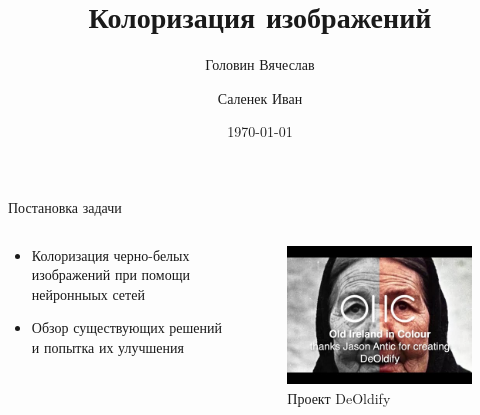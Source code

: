 \documentclass[aspectratio=169]{beamer}
\title[Заголовок]{Колоризация изображений}
\author{Головин Вячеслав \and Саленек Иван}
\date{\today}
\begin{document}
\renewcommand{\inserttotalframenumber}{8}   %

\frame[plain]{\titlepage}	%

\begin{frame}{Постановка задачи}
\begin{columns}
    \begin{column}{.6\textwidth}
    \begin{itemize}
        \item Колоризация черно-белых изображений при помощи нейронныых сетей
        
        \item Обзор существующих решений и попытка их улучшения
    \end{itemize}
    \end{column}
    \begin{column}{.4\textwidth}
    \begin{figure}
        \includegraphics[width=\textwidth]{DeOldify.jpeg}
        \caption*{Проект DeOldify}
    \end{figure}
    \end{column}
\end{columns}



\end{frame}
\end{document}
